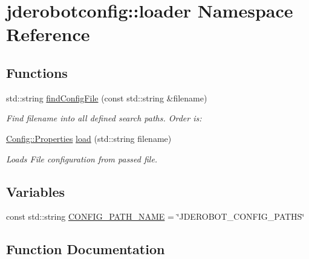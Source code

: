 \hypertarget{namespacejderobotconfig_1_1loader}{}\section{jderobotconfig\+:\+:loader Namespace Reference}
\label{namespacejderobotconfig_1_1loader}
\subsection*{Functions}
\begin{DoxyCompactItemize}
\item 
std\+::string \hyperlink{namespacejderobotconfig_1_1loader_a521f15425002acf9d87a5857ac38268f}{find\+Config\+File} (const std\+::string \&filename)
\begin{DoxyCompactList}\small\item\em Find filename into all defined search paths. Order is\+: \end{DoxyCompactList}\item 
\hyperlink{class_config_1_1_properties}{Config\+::\+Properties} \hyperlink{namespacejderobotconfig_1_1loader_a20d680d49aae952308a601aefca96fa4}{load} (std\+::string filename)
\begin{DoxyCompactList}\small\item\em Loads File configuration from passed file. \end{DoxyCompactList}\end{DoxyCompactItemize}
\subsection*{Variables}
\begin{DoxyCompactItemize}
\item 
const std\+::string \hyperlink{namespacejderobotconfig_1_1loader_a5b2c5f0990c440ef22a49c12951c6969}{C\+O\+N\+F\+I\+G\+\_\+\+P\+A\+T\+H\+\_\+\+N\+A\+ME} = \char`\"{}J\+D\+E\+R\+O\+B\+O\+T\+\_\+\+C\+O\+N\+F\+I\+G\+\_\+\+P\+A\+T\+HS\char`\"{}
\end{DoxyCompactItemize}


\subsection{Function Documentation}
\mbox{\label{namespacejderobotconfig_1_1loader_a521f15425002acf9d87a5857ac38268f}} 
